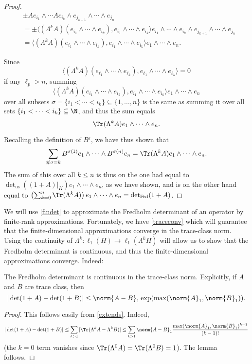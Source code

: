 \documentclass[12pt]{amsart}
\begin{document}
\begin{proof}
\begin{align*}
&\pm Ae_{i_1}\wedge \cdots Ae_{i_k}\wedge e_{j_{k+1}}\wedge \cdots\wedge e_{ j_n}\\
& = \pm\langle(\Lambda^k A)(e_{i_1}\wedge \cdots \wedge e_{i_k}), e_{i_{1}}\wedge\cdots\wedge e_{i_k}\rangle e_{i_1}\wedge \cdots \wedge e_{i_k} \wedge e_{j_{k+1}} \wedge \cdots \wedge e_{j_n}\\
&= \langle(\Lambda^k A)(e_{i_1}\wedge \cdots \wedge e_{i_k}), e_{i_{1}}\wedge\cdots\wedge e_{i_k}\rangle e_1\wedge \cdots \wedge e_n.\end{align*}

Since
\[\langle(\Lambda^k A)(e_{\ell_1}\wedge \cdots \wedge e_{\ell_k}), e_{\ell_{1}}\wedge\cdots\wedge e_{\ell_k}\rangle = 0\] if any $\ell_p > n$,
summing
\[\langle(\Lambda^k A)(e_{i_1}\wedge \cdots \wedge e_{i_k}), e_{i_{1}}\wedge\cdots\wedge e_{i_k}\rangle e_1\wedge \cdots \wedge e_n\]
over all subsets $\sigma = \{i_1 < \cdots < i_k\} \subseteq \{1,\ldots, n\}$ is the same as summing it over all sets $\{i_1 < \cdots < i_k\} \subseteq \N$, and thus the sum equals
\[\Tr(\Lambda^k A)e_1 \wedge \cdots \wedge e_n.\]

Recalling the definition of $B^j$, we have thus shown that 
\[\sum_{\#\sigma = k}B^{\sigma(1)}e_1 \wedge \cdots \wedge B^{\sigma(n)} e_n = \Tr(\Lambda^k A)e_1 \wedge \cdots \wedge e_n.\]
The sum of this over all $k \leq n$ is thus on the one had equal to $\det\nolimits_{\mathrm{us}}((1+A)|_K)e_1 \wedge \cdots \wedge e_n$, as we have shown, and is on the other hand equal to 
$\left(\sum_{k=0}^n \Tr(\Lambda^k A)\right)e_1 \wedge \cdots \wedge e_n = \det_{\mathrm{Frd}}(1+A)$.\end{proof}


We will use \cref{findet} to approximate the Fredholm determinant of an operator by finite-rank approximations. Fortunately, we have \cref{traceconv} which will guarantee that the finite-dimensional approximations converge in the trace-class norm. Using the continuity of $\Lambda^{k}:\ell_1(H) \to \ell_1(\Lambda^{k} H)$ will allow us to show that the Fredholm determinant is continuous, and thus the finite-dimensional approximations converge. Indeed:
\begin{lem}\label{detcont}The Fredholm determinant is continuous in the trace-class norm. Explicitly, if $A$ and $B$ are trace class, then
\[|\det(1+A)-\det(1+B)| \leq \norm{A-B}_1\exp(\max(\norm{A}_1,\norm{B}_1)).\]
\end{lem}
\begin{proof}
This follows easily from \cref{extends}. Indeed,
\[|\det(1+A)-\det(1+B)| \leq \sum_{k>1} |\Tr(\Lambda^k A - \Lambda^k B)| \leq \sum_{k > 1}\norm{A-B}_1\frac{\max(\norm{A}_1,\norm{B}_1)^{k-1}}{(k-1)!}\]
(the $k=0$ term vanishes since $\Tr(\Lambda^0 A) = \Tr(\Lambda^0 B) = 1$). The lemma follows.
\end{proof}
\end{document}
